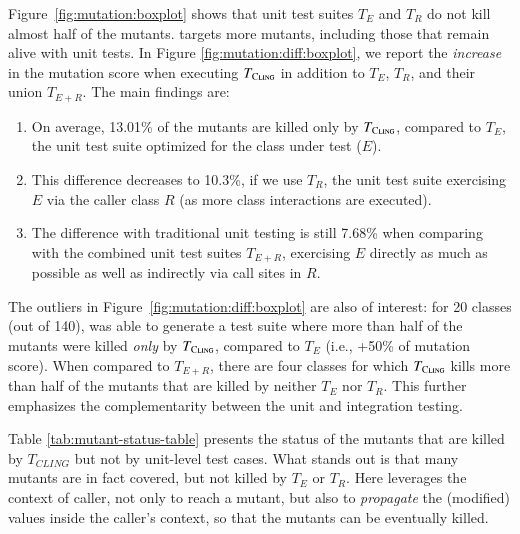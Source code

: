 Figure~\ref{fig:mutation:boxplot} shows that unit test suites $T_E$ and $T_R$ do not kill almost half of the mutants. \integration targets more mutants, including those that remain alive with unit tests.
In Figure \ref{fig:mutation:diff:boxplot}, we report the \emph{increase} in the mutation score when executing $T_\textsc{Cling}$ in addition to $T_E$, $T_R$, and their union $T_{E+R}$.
The main findings are:
\begin{enumerate}
\item On average, 13.01\% of the mutants are killed only by $T_{\textsc{Cling}}$, compared to $T_E$, the unit test suite optimized for the class under test ($E$).
\item This difference decreases to 10.3\%, if we use $T_R$, the unit test suite exercising $E$ via the caller class $R$ (as more class interactions are executed). %
\item The difference with traditional unit testing is still 7.68\% when comparing \integration with the combined unit test suites $T_{E+R}$, exercising $E$ directly as much as possible as well as indirectly via call sites in $R$.
\end{enumerate}

The outliers in Figure~\ref{fig:mutation:diff:boxplot} are also of interest: for 20 classes (out of 140), \cling was able to generate a test suite where more than half of the mutants were killed \emph{only} by $T_{\textsc{Cling}}$, compared to $T_E$ (i.e., +50\% of mutation score). When compared to $T_{E+R}$, there are four classes for which $T_{\textsc{Cling}}$ kills more than half of the mutants that are killed by neither $T_E$ nor $T_R$. This further emphasizes the complementarity between the unit and integration testing.


Table \ref{tab:mutant-status-table} presents the status of the mutants that are killed by $T_{CLING}$ but not by  unit-level test cases. 
What stands out is that many mutants are in fact covered, but not killed by $T_E$ or $T_R$.
Here \cling leverages the context of caller, not only to reach a mutant, but also to \emph{propagate} the (modified) values inside the caller's context, so that the mutants can be eventually killed.


